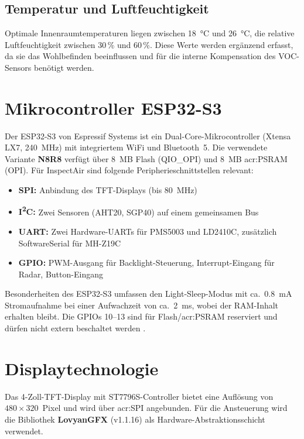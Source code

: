 \subsection{Temperatur und Luftfeuchtigkeit}
Optimale Innenraumtemperaturen liegen zwischen \SI{18}{\degreeCelsius} und \SI{26}{\degreeCelsius}, die relative Luftfeuchtigkeit zwischen 30\,\% und 60\,\%. Diese Werte werden ergänzend erfasst, da sie das Wohlbefinden beeinflussen und für die interne Kompensation des VOC-Sensors benötigt werden.

\section{Mikrocontroller ESP32-S3}
\label{sec:esp32s3}

Der ESP32-S3 von Espressif Systems ist ein Dual-Core-Mikrocontroller (Xtensa LX7, \SI{240}{MHz}) mit integriertem WiFi und Bluetooth~5. Die verwendete Variante \textbf{N8R8} verfügt über \SI{8}{MB} Flash (QIO\_OPI) und \SI{8}{MB} \acrshort{acr:PSRAM} (OPI). Für InspectAir sind folgende Peripherieschnittstellen relevant:

\begin{itemize}[nosep]
\item \textbf{SPI:} Anbindung des TFT-Displays (bis \SI{80}{MHz})
\item \textbf{I\textsuperscript{2}C:} Zwei Sensoren (AHT20, SGP40) auf einem gemeinsamen Bus
\item \textbf{UART:} Zwei Hardware-UARTs für PMS5003 und LD2410C, zusätzlich SoftwareSerial für MH-Z19C
\item \textbf{GPIO:} PWM-Ausgang für Backlight-Steuerung, Interrupt-Eingang für Radar, Button-Eingang
\end{itemize}

Besonderheiten des ESP32-S3 umfassen den Light-Sleep-Modus mit ca.\ \SI{0,8}{mA} Stromaufnahme bei einer Aufwachzeit von ca.\ \SI{2}{ms}, wobei der RAM-Inhalt erhalten bleibt. Die GPIOs 10--13 sind für Flash/\acrshort{acr:PSRAM} reserviert und dürfen nicht extern beschaltet werden \autocite{Espressif.2023}.

\section{Displaytechnologie}
\label{sec:display}

Das 4-Zoll-TFT-Display mit ST7796S-Controller bietet eine Auflösung von $480 \times 320$~Pixel und wird über \acrshort{acr:SPI} angebunden. Für die Ansteuerung wird die Bibliothek \textbf{LovyanGFX} (v1.1.16) als Hardware-Abstraktionsschicht verwendet.

